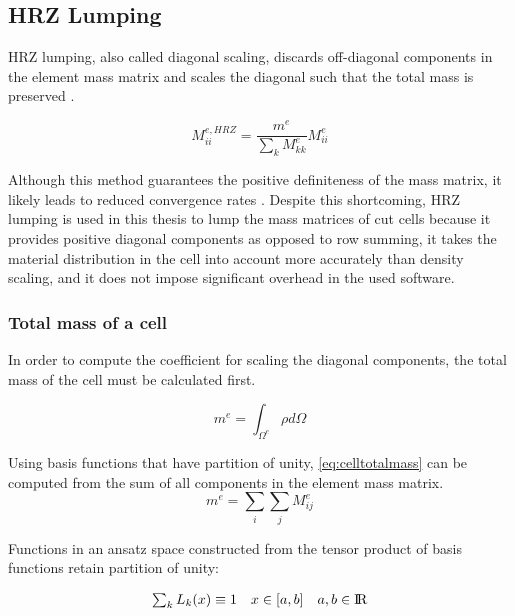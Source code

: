 \subsection{HRZ Lumping}
\label{section:hrzlumping}
%

HRZ lumping, also called diagonal scaling, discards off-diagonal components in the
element mass matrix and scales the diagonal such that the total mass is preserved \cite{Hinton1976}.

\begin{equation} \label{eq:hrzlumping}
	M_{ii}^{e,HRZ} =
		\frac{m^e}{\sum_k M_{kk}^e} M_{ii}^e
\end{equation}

Although this method guarantees the positive definiteness of the mass matrix, it
likely leads to reduced convergence rates \cite{Duczek2019}. Despite this shortcoming,
HRZ lumping is used in this thesis to lump the mass matrices of cut cells because
it provides positive diagonal components as opposed to row summing, it takes the
material distribution in the cell into account more accurately than density scaling, and
it does not impose significant overhead in the used software.

\subsubsection*{Total mass of a cell}
\label{section:totalmassofacell}

In order to compute the coefficient for scaling the diagonal components, the total
mass of the cell must be calculated first.

\begin{equation} \label{eq:celltotalmass}
	m^e = \int_{\Omega^e} \rho d\Omega
\end{equation}

Using basis functions that have partition of unity, \ref{eq:celltotalmass} can
be computed from the sum of all components in the element mass matrix.
\begin{equation} \label{eq:sumofmassmatrixcomponents}
	m^e = \sum_i \sum_j M_{ij}^e
\end{equation}


Functions in an ansatz space constructed from the tensor product of basis functions
retain partition of unity:

\begin{equation*}
\begin{array}{lll}
	\sum_k L_k(x) \equiv 1 & x \in [a,b] & a,b \in \rm I\!R \\
\end{array}
\end{equation*}

